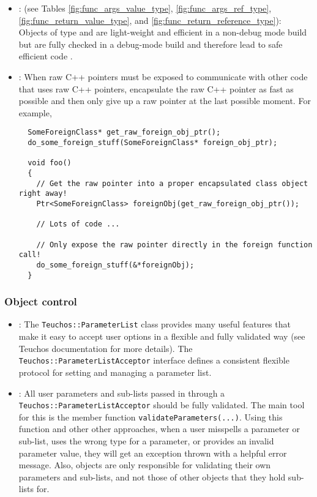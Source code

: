 \begin{itemize}
{}\item\GCGSemiPersisting: (see Tables
{}\ref{fig:func_args_value_type}, {}\ref{fig:func_args_ref_type},
{}\ref{fig:func_return_value_type}, and
{}\ref{fig:func_return_reference_type}): Objects of type {}
and {} are light-weight and efficient in a non-debug
mode build but are fully checked in a debug-mode build and therefore
lead to safe efficient code {}\cite{TeuchosMemoryManagementGuide}.


{}\item\GCGPostponeRawPointers: When raw C++ pointers must be exposed to
communicate with other code that uses raw C++ pointers, encapsulate the raw
C++ pointer as fast as possible and then only give up a raw pointer at the
last possible moment.  For example,

{\small\begin{verbatim}
  SomeForeignClass* get_raw_foreign_obj_ptr();
  do_some_foreign_stuff(SomeForeignClass* foreign_obj_ptr);

  void foo()
  {
    // Get the raw pointer into a proper encapsulated class object right away!
    Ptr<SomeForeignClass> foreignObj(get_raw_foreign_obj_ptr());

    // Lots of code ...

    // Only expose the raw pointer directly in the foreign function call! 
    do_some_foreign_stuff(&*foreignObj);
  }
\end{verbatim}}


\end{itemize}


%
\subsubsection{Object control}
%


\begin{itemize}


{}\item\GCGTeuchosParamterListAcceptor: The
{}\texttt{Teuchos\-::Parameter\-List} class provides many useful features that
make it easy to accept user options in a flexible and fully validated way (see
Teuchos documentation for more details).  The
{}\texttt{Teuchos\-::Parameter\-List\-Acceptor} interface defines a consistent
flexible protocol for setting and managing a parameter list.


{}\item\GCGTeuchosParamterListValidation: All user parameters and
sub-lists passed in through a
{}\texttt{Teuchos\-::Parameter\-List\-Acceptor} should be fully
validated.  The main tool for this is the member function
{}\texttt{validateParameters(...)}.  Using this function and other
other approaches, when a user misspells a parameter or sub-list, uses
the wrong type for a parameter, or provides an invalid parameter
value, they will get an exception thrown with a helpful error message.
Also, objects are only responsible for validating their own parameters
and sub-lists, and not those of other objects that they hold sub-lists
for.


\end{itemize}


